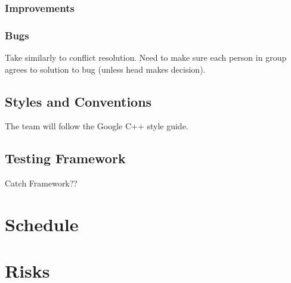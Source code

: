 \documentclass[11pt, titlepage]{article}
\begin{document}
    \subsubsection{Improvements}
    
    \subsubsection{Bugs} 
   	
    	Take similarly to conflict resolution.  Need to make sure each person in group agrees to solution to bug (unless head makes decision).
    
    \subsection{Styles and Conventions}
    	The team will follow the Google C++ style guide.
    
    \subsection{Testing Framework}
    	Catch Framework??
    
    \section{Schedule}
    
    
    \section{Risks}
    
\end{document}
